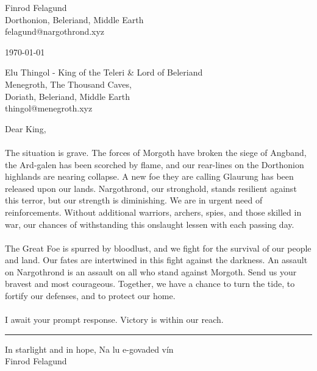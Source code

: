 \documentclass[a4paper, 10pt]{article}
\begin{document}
\small
\begin{flushright}
Finrod Felagund \\
Dorthonion, Beleriand, Middle Earth \\
felagund@nargothrond.xyz
\end{flushright}

\begin{flushright}
\today
\end{flushright}

\begin{flushleft}
Elu Thingol - King of the Teleri \& Lord of Beleriand \\
Menegroth, The Thousand Caves, \\
Doriath, Beleriand, Middle Earth \\
thingol@menegroth.xyz
\end{flushleft}

\begin{justify}
Dear King,
\\ \\
\indent The situation is grave. The forces of Morgoth have broken the siege of Angband, the Ard-galen has been scorched by flame, and our rear-lines on the Dorthonion highlands are nearing collapse. A new foe they are calling Glaurung has been released upon our lands. Nargothrond, our stronghold, stands resilient against this terror, but our strength is diminishing. We are in urgent need of reinforcements. Without additional warriors, archers, spies, and those skilled in war, our chances of withstanding this onslaught lessen with each passing day. 
\\ \\
\indent The Great Foe is spurred by bloodlust, and we fight for the survival of our people and land. Our fates are intertwined in this fight against the darkness. An assault on Nargothrond is an assault on all who stand against Morgoth. Send us your bravest and most courageous. Together, we have a chance to turn the tide, to fortify our defenses, and to protect our home.
\\ \\
\indent I await your prompt response. Victory is within our reach. 

\end{justify}

\vspace{0.2in}
\hrule
\vspace{0.2in}
\begin{flushleft}
In starlight and in hope, Na lu e-govaded vín \\
Finrod Felagund
\end{flushleft}
\end{document}
